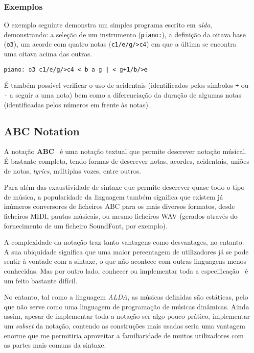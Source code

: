 \subsubsection{Exemplos}
O exemplo seguinte demonstra um simples programa escrito em \textit{alda}, demonstrando: a seleção de um instrumento (\texttt{piano:}), a definição da oitava base (\texttt{o3}), um acorde com quatro notas (\texttt{c1/e/g/>c4}) em que a última se encontra uma oitava acima das outras.
\begin{lstlisting}[caption={Exemplo da linguagem alda},captionpos=b,backgroundcolor=\color{softgray},rulecolor=\color{white},framesep=6pt]
piano: o3 c1/e/g/>c4 < b a g | < g+1/b/>e
\end{lstlisting}
 É também possível verificar o uso de acidentais (identificados pelos símbolos \texttt{+} ou \texttt{-} a seguir a uma nota) bem como a diferenciação da duração de algumas notas (identificadas pelos números em frente às notas).
\subsection{ABC Notation}
A notação \textbf{ABC}~\cite{abc-notation} é uma notação textual que permite descrever notação músical. É bastante completa, tendo formas de descrever notas, acordes, acidentais, uniões de notas, \textit{lyrics}, múltiplas vozes, entre outros.

Para além das exaustividade de sintaxe que permite descrever quase todo o tipo de música, a popularidade da linguagem também significa que existem já inúmeros conversores de ficheiros ABC para os mais diversos formatos, desde ficheiros MIDI, pautas músicais, ou mesmo ficheiros WAV (gerados através do fornecimento de um ficheiro SoundFont, por exemplo).

A complexidade da notação traz tanto vantagens como desvantages, no entanto: A sua ubiquidade significa que uma maior percentagem de utilizadores já se pode sentir à vontade com a sintaxe, o que não acontece com outras linguagens menos conhecidas. Mas por outro lado, conhecer ou implementar toda a especificação~\cite{abc-notation-standard} é um feito bastante difícil.

No entanto, tal como a linguagem \textit{ALDA}, as músicas definidas são estáticas, pelo que não serve como uma linguagem de programação de músicas dinâmicas. Ainda assim, apesar de implementar toda a notação ser algo pouco prático, implementar um \textit{subset} da notação, contendo as construções mais usadas seria uma vantagem enorme que me permitiria aproveitar a familiaridade de muitos utilizadores com as partes mais comuns da sintaxe.

